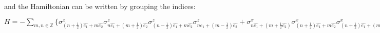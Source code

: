 \documentclass[12pt]{report}
\begin{document}
\begin{minipage}{1\textwidth}
\begin{center}
		\end{center}
		
		and the Hamiltonian can be written by grouping the indices:\newline
		
		\begin{center}
			
			$H = - \sum_{m,n \in \mathbb{Z}} \{ 
			\sigma^z_{(n+\frac{1}{2})\hat{e_1} + m\hat{e_2}} \sigma^z_{n\hat{e_1}+(m+\frac{1}{2})\hat{e_2}} \sigma^z_{(n-\frac{1}{2})\hat{e_1} + m\hat{e_2}} \sigma^z_{n\hat{e_1}+(m-\frac{1}{2})\hat{e_2}} +
			\sigma^x_{n\hat{e_1} + (m+\frac{1}{2}\hat{e_2})} \sigma^x_{(n+ \frac{1}{2})\hat{e_1} + m\hat{e_2}} \sigma^x_{(n+ \frac{1}{2})\hat{e_1} + (m + 1)\hat{e_2}} \sigma^x_{(n+ 1)\hat{e_1} + (m + \frac{1}{2})\hat{e_2}} \} $
			
		\end{center}
		
		
	\end{minipage}
	
\end{document}
